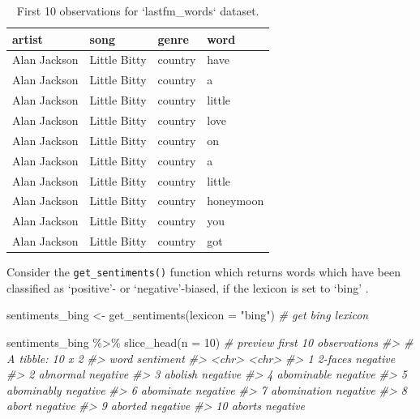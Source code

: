\documentclass[
]{article}
\newenvironment{Shaded}{\begin{snugshade}}{\end{snugshade}}
\newcommand{\AttributeTok}[1]{\textcolor[rgb]{0.77,0.63,0.00}{#1}}
\newcommand{\CommentTok}[1]{\textcolor[rgb]{0.56,0.35,0.01}{\textit{#1}}}
\newcommand{\DecValTok}[1]{\textcolor[rgb]{0.00,0.00,0.81}{#1}}
\newcommand{\FunctionTok}[1]{\textcolor[rgb]{0.00,0.00,0.00}{#1}}
\newcommand{\NormalTok}[1]{#1}
\newcommand{\OtherTok}[1]{\textcolor[rgb]{0.56,0.35,0.01}{#1}}
\newcommand{\SpecialCharTok}[1]{\textcolor[rgb]{0.00,0.00,0.00}{#1}}
\newcommand{\StringTok}[1]{\textcolor[rgb]{0.31,0.60,0.02}{#1}}
\begin{document}
\begin{table}

\caption{\label{tab:unnamed-chunk-5}First 10 observations for `lastfm_words` dataset.}
\centering
\begin{tabular}[t]{llll}
\toprule
artist & song & genre & word\\
\midrule
Alan Jackson & Little Bitty & country & have\\
Alan Jackson & Little Bitty & country & a\\
Alan Jackson & Little Bitty & country & little\\
Alan Jackson & Little Bitty & country & love\\
Alan Jackson & Little Bitty & country & on\\
\addlinespace
Alan Jackson & Little Bitty & country & a\\
Alan Jackson & Little Bitty & country & little\\
Alan Jackson & Little Bitty & country & honeymoon\\
Alan Jackson & Little Bitty & country & you\\
Alan Jackson & Little Bitty & country & got\\
\bottomrule
\end{tabular}
\end{table}

Consider the \texttt{get\_sentiments()} function which returns words which have been classified as `positive'- or `negative'-biased, if the lexicon is set to `bing' \citep{Hu2004}.

\begin{Shaded}
\begin{Highlighting}[]
\NormalTok{sentiments\_bing }\OtherTok{\textless{}{-}} \FunctionTok{get\_sentiments}\NormalTok{(}\AttributeTok{lexicon =} \StringTok{"bing"}\NormalTok{)  }\CommentTok{\# get \textquotesingle{}bing\textquotesingle{} lexicon}

\NormalTok{sentiments\_bing }\SpecialCharTok{\%\textgreater{}\%}
    \FunctionTok{slice\_head}\NormalTok{(}\AttributeTok{n =} \DecValTok{10}\NormalTok{)  }\CommentTok{\# preview first 10 observations}
\CommentTok{\#\textgreater{} \# A tibble: 10 x 2}
\CommentTok{\#\textgreater{}    word        sentiment}
\CommentTok{\#\textgreater{}    \textless{}chr\textgreater{}       \textless{}chr\textgreater{}    }
\CommentTok{\#\textgreater{}  1 2{-}faces     negative }
\CommentTok{\#\textgreater{}  2 abnormal    negative }
\CommentTok{\#\textgreater{}  3 abolish     negative }
\CommentTok{\#\textgreater{}  4 abominable  negative }
\CommentTok{\#\textgreater{}  5 abominably  negative }
\CommentTok{\#\textgreater{}  6 abominate   negative }
\CommentTok{\#\textgreater{}  7 abomination negative }
\CommentTok{\#\textgreater{}  8 abort       negative }
\CommentTok{\#\textgreater{}  9 aborted     negative }
\CommentTok{\#\textgreater{} 10 aborts      negative}
\end{Highlighting}
\end{Shaded}
\end{document}
